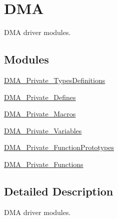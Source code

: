\hypertarget{group___d_m_a}{\section{D\-M\-A}
\label{group___d_m_a}
}


D\-M\-A driver modules.  


\subsection*{Modules}
\begin{DoxyCompactItemize}
\item 
\hyperlink{group___d_m_a___private___types_definitions}{D\-M\-A\-\_\-\-Private\-\_\-\-Types\-Definitions}
\item 
\hyperlink{group___d_m_a___private___defines}{D\-M\-A\-\_\-\-Private\-\_\-\-Defines}
\item 
\hyperlink{group___d_m_a___private___macros}{D\-M\-A\-\_\-\-Private\-\_\-\-Macros}
\item 
\hyperlink{group___d_m_a___private___variables}{D\-M\-A\-\_\-\-Private\-\_\-\-Variables}
\item 
\hyperlink{group___d_m_a___private___function_prototypes}{D\-M\-A\-\_\-\-Private\-\_\-\-Function\-Prototypes}
\item 
\hyperlink{group___d_m_a___private___functions}{D\-M\-A\-\_\-\-Private\-\_\-\-Functions}
\end{DoxyCompactItemize}


\subsection{Detailed Description}
D\-M\-A driver modules. 